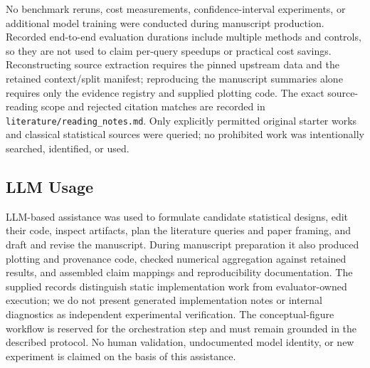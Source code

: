 \documentclass{article}
\begin{document}
No benchmark reruns, cost measurements, confidence-interval experiments, or additional model training were conducted during manuscript production. Recorded end-to-end evaluation durations include multiple methods and controls, so they are not used to claim per-query speedups or practical cost savings. Reconstructing source extraction requires the pinned upstream data and the retained context/split manifest; reproducing the manuscript summaries alone requires only the evidence registry and supplied plotting code. The exact source-reading scope and rejected citation matches are recorded in \texttt{literature/reading\_notes.md}. Only explicitly permitted original starter works and classical statistical sources were queried; no prohibited work was intentionally searched, identified, or used.

\subsection{LLM Usage}
LLM-based assistance was used to formulate candidate statistical designs, edit their code, inspect artifacts, plan the literature queries and paper framing, and draft and revise the manuscript. During manuscript preparation it also produced plotting and provenance code, checked numerical aggregation against retained results, and assembled claim mappings and reproducibility documentation. The supplied records distinguish static implementation work from evaluator-owned execution; we do not present generated implementation notes or internal diagnostics as independent experimental verification. The conceptual-figure workflow is reserved for the orchestration step and must remain grounded in the described protocol. No human validation, undocumented model identity, or new experiment is claimed on the basis of this assistance.
\end{document}
